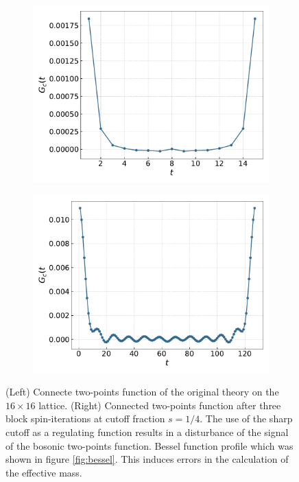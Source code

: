 \begin{figure}
    \centering 
    \begin{subfigure}{0.48\textwidth}
        \includegraphics[width=\textwidth]{figures/conn2ptf16.pdf}
    \end{subfigure}
    \begin{subfigure}{0.48\textwidth}
        \includegraphics[width=\textwidth]{figures/conn2ptf128.pdf}
    \end{subfigure}
    \caption[Effect of the sharp cutoff on the connected two-points function]{(Left) Connecte two-points function of the original theory on the $16 \times 16$ lattice. (Right) Connected two-points function after three block spin-iterations at cutoff fraction $s=1/4$. The use of the sharp cutoff as a regulating function results in a disturbance of the signal of the bosonic two-points function. Bessel function profile which was shown in figure \ref{fig:bessel}. This induces errors in the calculation of the effective mass.}
    \label{fig:connected_2ptf}
\end{figure}
